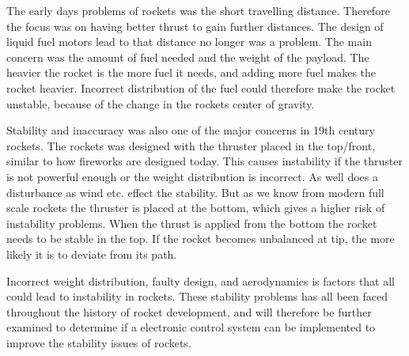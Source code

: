 The early days problems of rockets was the short travelling distance. Therefore the focus was on having better thrust to gain further distances. The design of liquid fuel motors lead to that distance no longer was a problem. The main concern was the amount of fuel needed and the weight of the payload. The heavier the rocket is the more fuel it needs, and adding more fuel makes the rocket heavier. Incorrect distribution of the fuel could therefore make the rocket unstable, because of the change in the rockets center of gravity.


Stability and inaccuracy was also one of the major concerns in 19th century rockets. The rockets was designed with the thruster placed in the top/front, similar to how fireworks are designed today. This causes instability if the thruster is not powerful enough or the weight distribution is incorrect. As well does a disturbance as wind etc. effect the stability. But as we know from modern full scale rockets the thruster is placed at the bottom, which gives a higher risk of instability problems. When the thrust is applied from the bottom the rocket needs to be stable in the top. If the rocket becomes unbalanced at tip, the more likely it is to deviate from its path. 



\bigbreak
Incorrect weight distribution, faulty design, and aerodynamics is factors that all could lead to instability in rockets. These stability problems has all been faced throughout the history of rocket development, and will therefore be further examined to determine if a electronic control system can be implemented to improve the stability issues of rockets.



